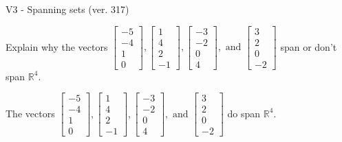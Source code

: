 \begin{exercise}
  \begin{exerciseTitle}V3 - Spanning sets (ver. 317)\end{exerciseTitle}
  \begin{exerciseStatement}
    Explain why the vectors \(\left[\begin{array}{r}
-5 \\
-4 \\
1 \\
0
\end{array}\right] , \left[\begin{array}{r}
1 \\
4 \\
2 \\
-1
\end{array}\right] , \left[\begin{array}{r}
-3 \\
-2 \\
0 \\
4
\end{array}\right] , \text{ and } \left[\begin{array}{r}
3 \\
2 \\
0 \\
-2
\end{array}\right]\) span or don't span \(\mathbb{R}^4\). 
	


  \end{exerciseStatement}
  \begin{exerciseAnswer}
   The vectors \(\left[\begin{array}{r}
-5 \\
-4 \\
1 \\
0
\end{array}\right] , \left[\begin{array}{r}
1 \\
4 \\
2 \\
-1
\end{array}\right] , \left[\begin{array}{r}
-3 \\
-2 \\
0 \\
4
\end{array}\right] , \text{ and } \left[\begin{array}{r}
3 \\
2 \\
0 \\
-2
\end{array}\right]\) 
  	 do  
	span \(\mathbb{R}^4\).
  


  \end{exerciseAnswer}
\end{exercise}